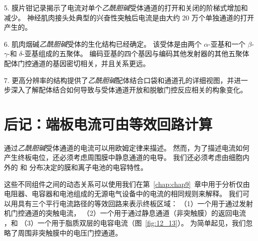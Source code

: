 5. 膜片钳记录揭示了电流对单个\textit{乙酰胆碱}受体通道的打开和关闭的阶梯式增加和减少。
神经肌肉接头处典型的兴奋性突触后电流是由大约 20 万个单独通道的打开产生的。 


6. 肌肉烟碱\textit{乙酰胆碱}受体的生化结构已经确定。
该受体是由两个 $\alpha$-亚基和一个 $\beta$-$\gamma$-和 $\delta$-亚基组成的五聚体。
编码亚基的四个基因与编码其他发射器的其他五聚体配体门控通道的基因密切相关，并且关系更远。 


7. 更高分辨率的结构提供了\textit{乙酰胆碱}配体结合口袋和通道孔的详细视图，并进一步深入了解配体结合如何导致与受体通道开放和脱敏门控反应相关的构象变化。


\section{后记：端板电流可由等效回路计算}

通过\textit{乙酰胆碱}受体通道的电流可以用欧姆定律来描述。
然而，为了描述电流如何产生终板电位，还必须考虑周围膜中静息通道的电导。
我们还必须考虑由细胞内外的  和  分布决定的膜和离子电池的电容特性。


这些不同组件之间的动态关系可以使用我们在第~\ref{chap:chap9}~章中用于分析仅由电阻器、电容器和电池组成的无源电气设备中的电流的相同规则来解释。
我们可以用具有三个平行电流路径的等效回路来表示终板区域：
（1）一个用于通过发射机门控通道的突触电流，
（2）一个用于通过静息通道（非突触膜）的返回电流 ，和
（3）一个用于脂质双层的电容电流（图~\ref{fig:12_13}）。
为简单起见，我们忽略了周围非突触膜中的电压门控通道。


